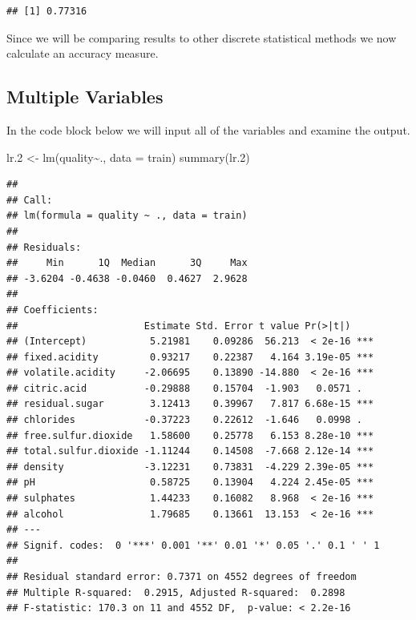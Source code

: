 \documentclass[
]{book}
\newenvironment{Shaded}{\begin{snugshade}}{\end{snugshade}}
\newcommand{\AttributeTok}[1]{\textcolor[rgb]{0.77,0.63,0.00}{#1}}
\newcommand{\FloatTok}[1]{\textcolor[rgb]{0.00,0.00,0.81}{#1}}
\newcommand{\FunctionTok}[1]{\textcolor[rgb]{0.00,0.00,0.00}{#1}}
\newcommand{\NormalTok}[1]{#1}
\newcommand{\OtherTok}[1]{\textcolor[rgb]{0.56,0.35,0.01}{#1}}
\newcommand{\SpecialCharTok}[1]{\textcolor[rgb]{0.00,0.00,0.00}{#1}}
\begin{document}
\begin{verbatim}
## [1] 0.77316
\end{verbatim}

Since we will be comparing results to other discrete statistical methods we now calculate an accuracy measure.

\begin{Shaded}
\end{Shaded}

\hypertarget{multiple-variables}{%
\subsection{Multiple Variables}\label{multiple-variables}}

In the code block below we will input all of the variables and examine the output.

\begin{Shaded}
\begin{Highlighting}[]
\NormalTok{lr}\FloatTok{.2} \OtherTok{\textless{}{-}} \FunctionTok{lm}\NormalTok{(quality}\SpecialCharTok{\textasciitilde{}}\NormalTok{., }\AttributeTok{data =}\NormalTok{ train)}
\FunctionTok{summary}\NormalTok{(lr}\FloatTok{.2}\NormalTok{)}
\end{Highlighting}
\end{Shaded}

\begin{verbatim}
## 
## Call:
## lm(formula = quality ~ ., data = train)
## 
## Residuals:
##     Min      1Q  Median      3Q     Max 
## -3.6204 -0.4638 -0.0460  0.4627  2.9628 
## 
## Coefficients:
##                      Estimate Std. Error t value Pr(>|t|)    
## (Intercept)           5.21981    0.09286  56.213  < 2e-16 ***
## fixed.acidity         0.93217    0.22387   4.164 3.19e-05 ***
## volatile.acidity     -2.06695    0.13890 -14.880  < 2e-16 ***
## citric.acid          -0.29888    0.15704  -1.903   0.0571 .  
## residual.sugar        3.12413    0.39967   7.817 6.68e-15 ***
## chlorides            -0.37223    0.22612  -1.646   0.0998 .  
## free.sulfur.dioxide   1.58600    0.25778   6.153 8.28e-10 ***
## total.sulfur.dioxide -1.11244    0.14508  -7.668 2.12e-14 ***
## density              -3.12231    0.73831  -4.229 2.39e-05 ***
## pH                    0.58725    0.13904   4.224 2.45e-05 ***
## sulphates             1.44233    0.16082   8.968  < 2e-16 ***
## alcohol               1.79685    0.13661  13.153  < 2e-16 ***
## ---
## Signif. codes:  0 '***' 0.001 '**' 0.01 '*' 0.05 '.' 0.1 ' ' 1
## 
## Residual standard error: 0.7371 on 4552 degrees of freedom
## Multiple R-squared:  0.2915, Adjusted R-squared:  0.2898 
## F-statistic: 170.3 on 11 and 4552 DF,  p-value: < 2.2e-16
\end{verbatim}
\end{document}
